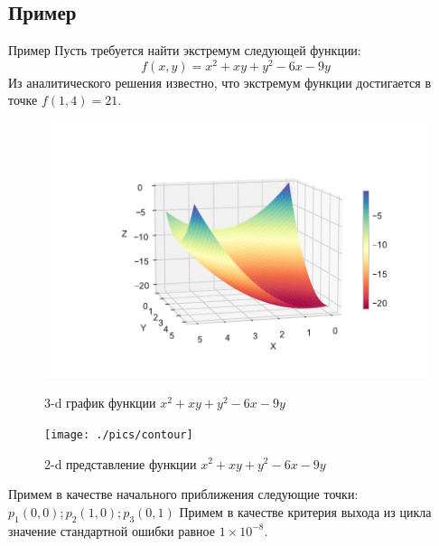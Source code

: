 \documentclass[aspectratio=169, mathserif]{beamer}	%
\begin{document}
\subsection{Пример}
\begin{frame}[fragile]{Пример}
\scriptsize
Пусть требуется найти экстремум следующей функции:
$$
f\left(x, y\right) = x^2 + xy + y^2 - 6x - 9y
$$
Из аналитического решения известно, что экстремум функции достигается в точке $f\left(1,4\right)=21$.
\begin{figure}[h!]
	\centering
	\begin{minipage}{.45\textwidth}
		\includegraphics[width=\linewidth]{./pics/3dplot}
		\caption{3-d график функции $x^2 + xy + y^2 - 6x - 9y$}
		\label{fig:3d}
	\end{minipage}
	\begin{minipage}{.65\textheight}
		\texttt{[image: ./pics/contour]}
		\caption{2-d представление функции $x^2 + xy + y^2 - 6x - 9y$}
		\label{fig:contour}
	\end{minipage}
\end{figure}
Примем в качестве начального приближения следующие точки:
$
p_1\left(0,0\right); p_2\left(1,0\right); p_3\left(0, 1\right)
$
Примем в качестве критерия выхода из цикла значение стандартной ошибки равное $1\times 10^{-8}$.
\vfill
\end{frame}
\end{document}
